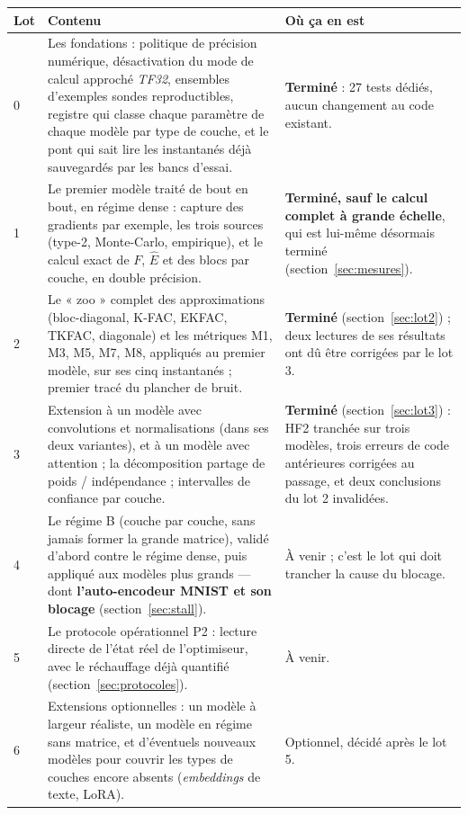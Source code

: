 \documentclass[11pt,a4paper]{article}
\newcommand{\eng}[1]{\emph{#1}}
\begin{document}
\begin{center}
\small
\begin{tabular}{@{}p{0.6cm}p{5.4cm}p{5.6cm}@{}}
\toprule
Lot & Contenu & Où ça en est \\
\midrule
0 & Les fondations : politique de précision numérique, désactivation du mode de calcul approché
\eng{TF32}, ensembles d'exemples sondes reproductibles, registre qui classe chaque paramètre de
chaque modèle par type de couche, et le pont qui sait lire les instantanés déjà sauvegardés par les
bancs d'essai. & \textbf{Terminé} : 27 tests dédiés, aucun changement au code existant. \\
1 & Le premier modèle traité de bout en bout, en régime dense : capture des gradients par exemple,
les trois sources (type-2, Monte-Carlo, empirique), et le calcul exact de $F$, $\hat E$ et des blocs
par couche, en double précision. & \textbf{Terminé, sauf le calcul complet à grande échelle}, qui
est lui-même désormais terminé (section~\ref{sec:mesures}). \\
2 & Le « zoo » complet des approximations (bloc-diagonal, K-FAC, EKFAC, TKFAC, diagonale) et les
métriques M1, M3, M5, M7, M8, appliqués au premier modèle, sur ses cinq instantanés ; premier tracé
du plancher de bruit. & \textbf{Terminé} (section~\ref{sec:lot2}) ; deux lectures de ses résultats
ont dû être corrigées par le lot 3. \\
3 & Extension à un modèle avec convolutions et normalisations (dans ses deux variantes), et à un
modèle avec attention ; la décomposition partage de poids / indépendance ; intervalles de confiance
par couche. & \textbf{Terminé} (section~\ref{sec:lot3}) : HF2 tranchée sur trois modèles, trois
erreurs de code antérieures corrigées au passage, et deux conclusions du lot 2 invalidées. \\
4 & Le régime B (couche par couche, sans jamais former la grande matrice), validé d'abord contre le
régime dense, puis appliqué aux modèles plus grands — dont \textbf{l'auto-encodeur MNIST et son
blocage} (section~\ref{sec:stall}). & À venir ; c'est le lot qui doit trancher la cause du blocage. \\
5 & Le protocole opérationnel P2 : lecture directe de l'état réel de l'optimiseur, avec le
réchauffage déjà quantifié (section~\ref{sec:protocoles}). & À venir. \\
6 & Extensions optionnelles : un modèle à largeur réaliste, un modèle en régime sans matrice, et
d'éventuels nouveaux modèles pour couvrir les types de couches encore absents (\eng{embeddings} de
texte, LoRA). & Optionnel, décidé après le lot 5. \\
\bottomrule
\end{tabular}
\end{center}
\end{document}
